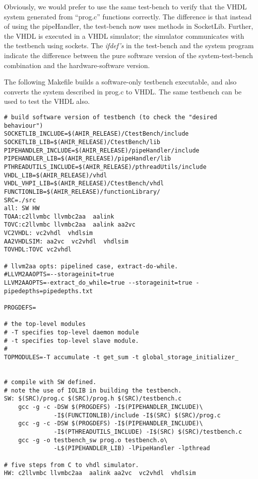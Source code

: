 \documentclass{article}
\begin{document}
Obviously, we would prefer to use the same test-bench
to verify that the VHDL system generated from ``prog.c'' 
functions correctly.  
The difference is that instead of using the pipeHandler,
the test-bench now uses methods in SocketLib.  Further, the
VHDL is executed in a VHDL simulator; the simulator communicates
with the testbench using sockets.
The {\em ifdef's} in the test-bench and the system program
indicate the difference between the pure software version
of the system-test-bench combination and the hardware-software
version.  

The following Makefile builds a software-only testbench
executable, and also converts the system described in prog.c
to VHDL.  The same testbench can be used to test the VHDL
also.
\begin{verbatim}
# build software version of testbench (to check the "desired behaviour")
SOCKETLIB_INCLUDE=$(AHIR_RELEASE)/CtestBench/include
SOCKETLIB_LIB=$(AHIR_RELEASE)/CtestBench/lib
PIPEHANDLER_INCLUDE=$(AHIR_RELEASE)/pipeHandler/include
PIPEHANDLER_LIB=$(AHIR_RELEASE)/pipeHandler/lib
PTHREADUTILS_INCLUDE=$(AHIR_RELEASE)/pthreadUtils/include
VHDL_LIB=$(AHIR_RELEASE)/vhdl
VHDL_VHPI_LIB=$(AHIR_RELEASE)/CtestBench/vhdl
FUNCTIONLIB=$(AHIR_RELEASE)/functionLibrary/
SRC=./src
all: SW HW 
TOAA:c2llvmbc llvmbc2aa  aalink
TOVC:c2llvmbc llvmbc2aa  aalink aa2vc 
VC2VHDL: vc2vhdl  vhdlsim
AA2VHDLSIM: aa2vc  vc2vhdl  vhdlsim
TOVHDL:TOVC vc2vhdl

# llvm2aa opts: pipelined case, extract-do-while.
#LLVM2AAOPTS=--storageinit=true
LLVM2AAOPTS=-extract_do_while=true --storageinit=true -pipedepths=pipedepths.txt

PROGDEFS=

# the top-level modules
# -T specifies top-level daemon module
# -t specifies top-level slave module.
#
TOPMODULES=-T accumulate -t get_sum -t global_storage_initializer_


# compile with SW defined.
# note the use of IOLIB in building the testbench.
SW: $(SRC)/prog.c $(SRC)/prog.h $(SRC)/testbench.c 
	gcc -g -c -DSW $(PROGDEFS) -I$(PIPEHANDLER_INCLUDE)\
              -I$(FUNCTIONLIB)/include -I$(SRC) $(SRC)/prog.c
	gcc -g -c -DSW $(PROGDEFS) -I$(PIPEHANDLER_INCLUDE)\
              -I$(PTHREADUTILS_INCLUDE) -I$(SRC) $(SRC)/testbench.c
	gcc -g -o testbench_sw prog.o testbench.o\
              -L$(PIPEHANDLER_LIB) -lPipeHandler -lpthread

# five steps from C to vhdl simulator.
HW: c2llvmbc llvmbc2aa  aalink aa2vc  vc2vhdl  vhdlsim


\end{verbatim}
\end{document}
